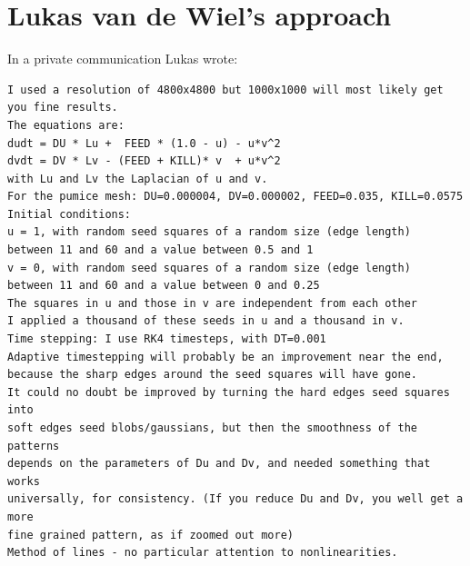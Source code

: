 \section*{Lukas van de Wiel's approach}

In a private communication Lukas wrote:
{\small 
\begin{verbatim}
I used a resolution of 4800x4800 but 1000x1000 will most likely get you fine results.
The equations are:
dudt = DU * Lu +  FEED * (1.0 - u) - u*v^2
dvdt = DV * Lv - (FEED + KILL)* v  + u*v^2
with Lu and Lv the Laplacian of u and v.
For the pumice mesh: DU=0.000004, DV=0.000002, FEED=0.035, KILL=0.0575
Initial conditions:
u = 1, with random seed squares of a random size (edge length) 
between 11 and 60 and a value between 0.5 and 1
v = 0, with random seed squares of a random size (edge length) 
between 11 and 60 and a value between 0 and 0.25
The squares in u and those in v are independent from each other
I applied a thousand of these seeds in u and a thousand in v.
Time stepping: I use RK4 timesteps, with DT=0.001
Adaptive timestepping will probably be an improvement near the end,  
because the sharp edges around the seed squares will have gone.
It could no doubt be improved by turning the hard edges seed squares into 
soft edges seed blobs/gaussians, but then the smoothness of the patterns
depends on the parameters of Du and Dv, and needed something that works 
universally, for consistency. (If you reduce Du and Dv, you well get a more 
fine grained pattern, as if zoomed out more) 
Method of lines - no particular attention to nonlinearities. 
\end{verbatim}
}


